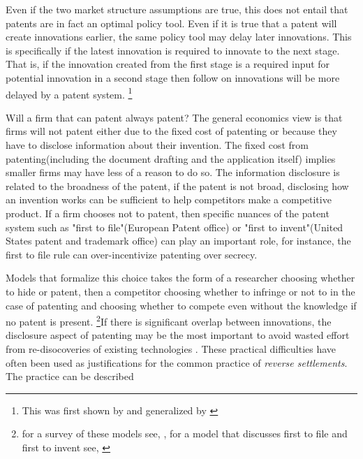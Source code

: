 \documentclass[12pt]{article}
\numberwithin{equation}{section}
\begin{document}

Even if the two market structure assumptions are true, this does not entail that patents are in fact an optimal policy tool. Even if it is true that a patent will create innovations earlier, the same policy tool may delay later innovations. This is specifically if the latest innovation is required to innovate to the next stage. That is, if the innovation created from the first stage is a required input for potential innovation in a second stage then follow on innovations will be more delayed by a patent system. \footnote{This was first shown by \cite{bessen_maskin} and generalized by \cite{Bryan2017}}


Will a firm that can patent always patent? The general economics view is that firms will not patent either due to the fixed cost of patenting or because they have to disclose information about their invention. The fixed cost from patenting(including the document drafting and the application itself) implies smaller firms may have less of a reason to do so. The information disclosure is related to the broadness of the patent, if the patent is not broad, disclosing how an invention works can be sufficient to help competitors make a competitive product. If a firm chooses not to patent, then specific nuances of the patent system such as "first to file"(European Patent office) or "first to invent"(United States patent and trademark office) can play an important role, for instance, the first to file rule can over-incentivize patenting over secrecy.


Models that formalize this choice takes the form of a researcher choosing whether to hide or patent, then a competitor choosing whether to infringe or not to in the case of patenting and choosing whether to compete even without the knowledge if no patent is present. \footnote{for a survey of these models see, \cite{Hall2014}, for a model that discusses first to file and first to invent see, \cite{Scotchmer1990} }If there is significant overlap between innovations, the disclosure aspect of patenting may be the most important to avoid wasted effort from re-disocoveries of existing technologies \citep{Kultti2007}. These practical difficulties have often been used as justifications for the common practice of \textit{reverse settlements}. The practice can be described

\end{document}
